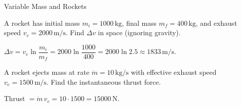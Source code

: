 \begin{KnowledgePoint}{Variable Mass and Rockets \Extension}
  \KPProblems
\begin{cheatproblem}
  A rocket has initial mass $m_i=1000\,\text{kg}$, final mass $m_f=400\,\text{kg}$, and exhaust speed $v_e=2000\,\text{m/s}$. Find $\Delta v$ in space (ignoring gravity).
\begin{solutionbox}
  $\Delta v=v_e\ln\dfrac{m_i}{m_f}=2000\ln\dfrac{1000}{400}=2000\ln2.5\approx1833\,\text{m/s}$.
\end{solutionbox}
\end{cheatproblem}
\begin{cheatproblem}
  A rocket ejects mass at rate $\dot m=10\,\text{kg/s}$ with effective exhaust speed $v_e=1500\,\text{m/s}$. Find the instantaneous thrust force.
\begin{solutionbox}
  Thrust $=\dot m\,v_e=10\cdot1500=15000\,\text{N}$.
\end{solutionbox}
\end{cheatproblem}
\end{KnowledgePoint}

